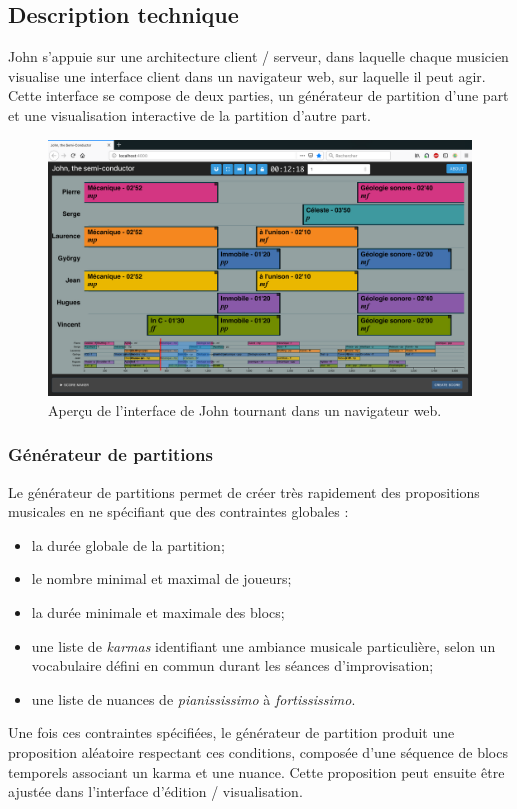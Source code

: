 \subsection{Description technique}

\noindent John s'appuie sur une architecture client / serveur, dans laquelle chaque musicien visualise une interface client dans un navigateur web, sur laquelle il peut agir. Cette interface se compose de deux parties, un générateur de partition d'une part et une visualisation interactive de la partition d'autre part.
\begin{figure}[!htbp]
	\includegraphics[width=\textwidth]{gfx/notation/John-snapshot.png}
	\caption[John : capture écran de l'interface client]{Aperçu de l'interface de John tournant dans un navigateur web.}
	\label{fig:notation:john-snapshot}
\end{figure}
\subsubsection{Générateur de partitions}

\noindent Le générateur de partitions permet de créer très rapidement des propositions musicales en ne spécifiant que des contraintes globales :
\vspace{-1em}
\begin{itemize}[noitemsep]
	\item la durée globale de la partition;
	\item le nombre minimal et maximal de joueurs;
	\item la durée minimale et maximale des blocs;
	\item une liste de \textit{karmas} identifiant une ambiance musicale particulière, selon un vocabulaire défini en commun durant les séances d'improvisation;
	\item une liste de nuances de \textit{pianississimo} à \textit{fortississimo}.
\end{itemize}
%
\noindent Une fois ces contraintes spécifiées, le générateur de partition produit une proposition aléatoire respectant ces conditions, composée d'une séquence de blocs temporels associant un karma et une nuance. Cette proposition peut ensuite être ajustée dans l'interface d'édition / visualisation.

